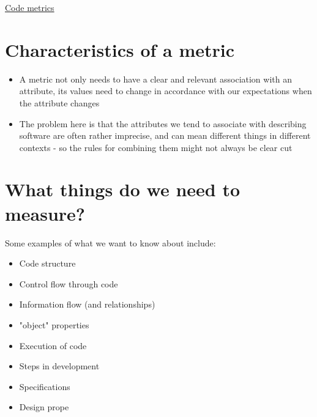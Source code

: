 \documentclass{article}[18pt]
\begin{document}
\begin{center}
\underline{\huge Code metrics}
\end{center}
\section{Characteristics of a metric}
\begin{itemize}
	\item A metric not only needs to have a clear and relevant association with an attribute, its values need to change in accordance with our expectations when the attribute changes
	\item The problem here is that the attributes we tend to associate with describing software are often rather imprecise, and can mean different things in different contexts - so the rules for combining them might not always be clear cut
\end{itemize}
\section{What things do we need to measure?}
Some examples of what we want to know about include:
\begin{itemize}
	\item Code structure
	\item Control flow through code
	\item Information flow (and relationships)
	\item "object" properties
	\item Execution of code
	\item Steps in development
	\item Specifications
	\item Design prope
\end{itemize}
\end{document}
